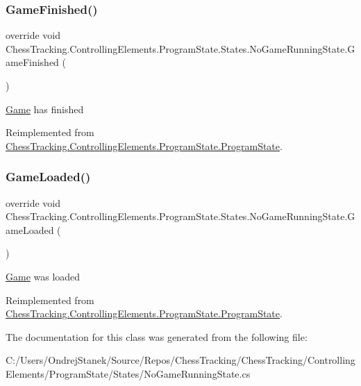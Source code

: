 \subsubsection{\texorpdfstring{GameFinished()}{GameFinished()}}
{\footnotesize\ttfamily override void Chess\+Tracking.\+Controlling\+Elements.\+Program\+State.\+States.\+No\+Game\+Running\+State.\+Game\+Finished (\begin{DoxyParamCaption}{ }\end{DoxyParamCaption})\hspace{0.3cm}{\ttfamily [virtual]}}



\mbox{\hyperlink{namespace_chess_tracking_1_1_game}{Game}} has finished 



Reimplemented from \mbox{\hyperlink{class_chess_tracking_1_1_controlling_elements_1_1_program_state_1_1_program_state_a03a8db068264aa4ec11e8d473b6d3c46}{Chess\+Tracking.\+Controlling\+Elements.\+Program\+State.\+Program\+State}}.

\mbox{\label{class_chess_tracking_1_1_controlling_elements_1_1_program_state_1_1_states_1_1_no_game_running_state_a1e892271241639d1e2a77739a8e58892}} 
\subsubsection{\texorpdfstring{GameLoaded()}{GameLoaded()}}
{\footnotesize\ttfamily override void Chess\+Tracking.\+Controlling\+Elements.\+Program\+State.\+States.\+No\+Game\+Running\+State.\+Game\+Loaded (\begin{DoxyParamCaption}{ }\end{DoxyParamCaption})\hspace{0.3cm}{\ttfamily [virtual]}}



\mbox{\hyperlink{namespace_chess_tracking_1_1_game}{Game}} was loaded 



Reimplemented from \mbox{\hyperlink{class_chess_tracking_1_1_controlling_elements_1_1_program_state_1_1_program_state_ae44259fd379473c103e8957d51832de9}{Chess\+Tracking.\+Controlling\+Elements.\+Program\+State.\+Program\+State}}.



The documentation for this class was generated from the following file\+:\begin{DoxyCompactItemize}
\item 
C\+:/\+Users/\+Ondrej\+Stanek/\+Source/\+Repos/\+Chess\+Tracking/\+Chess\+Tracking/\+Controlling\+Elements/\+Program\+State/\+States/No\+Game\+Running\+State.\+cs\end{DoxyCompactItemize}
